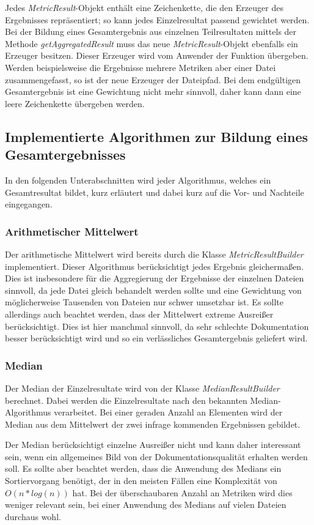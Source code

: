 Jedes \textit{MetricResult}-Objekt enthält eine Zeichenkette, die den Erzeuger des Ergebnisses repräsentiert; so kann jedes Einzelresultat passend gewichtet werden. Bei der Bildung eines Gesamtergebnis aus einzelnen Teilresultaten mittels der Methode \textit{getAggregatedResult} muss das neue \textit{MetricResult}-Objekt ebenfalls ein Erzeuger besitzen. Dieser Erzeuger wird vom Anwender der Funktion übergeben. Werden beispielsweise die Ergebnisse mehrere Metriken aber einer Datei zusammengefasst, so ist der neue Erzeuger der Dateipfad. Bei dem endgültigen Gesamtergebnis ist eine Gewichtung nicht mehr sinnvoll, daher kann dann eine leere Zeichenkette übergeben werden.

\subsection{Implementierte Algorithmen zur Bildung eines Gesamtergebnisses}
In den folgenden Unterabschnitten wird jeder Algorithmus, welches ein Gesamtresultat bildet, kurz erläutert und dabei kurz auf die Vor- und Nachteile eingegangen. 

\subsubsection{Arithmetischer Mittelwert}
Der arithmetische Mittelwert wird bereits durch die Klasse \textit{MetricResultBuilder} implementiert. Dieser Algorithmus berücksichtigt jedes Ergebnis gleichermaßen. Dies ist insbesondere für die Aggregierung der Ergebnisse der einzelnen Dateien sinnvoll, da jede Datei gleich behandelt werden sollte und eine Gewichtung von möglicherweise Tausenden von Dateien nur schwer umsetzbar ist. Es sollte allerdings auch beachtet werden, dass der Mittelwert extreme Ausreißer berücksichtigt. Dies ist hier manchmal sinnvoll, da sehr schlechte Dokumentation besser berücksichtigt wird und so ein verlässliches Gesamtergebnis geliefert wird.


\subsubsection{Median}
Der Median der Einzelresultate wird von der Klasse \textit{MedianResultBuilder} berechnet. Dabei werden die Einzelresultate nach den bekannten Median-Algorithmus verarbeitet. Bei einer geraden Anzahl an Elementen wird der Median aus dem Mittelwert der zwei infrage kommenden Ergebnissen gebildet. 

Der Median berücksichtigt einzelne Ausreißer nicht und kann daher interessant sein, wenn ein allgemeines Bild von der Dokumentationsqualität erhalten werden soll. Es sollte aber beachtet werden, dass die Anwendung des Medians ein Sortiervorgang benötigt, der in den meisten Fällen eine Komplexität von $O(n*log(n))$ hat. Bei der überschaubaren Anzahl an Metriken wird dies weniger relevant sein, bei einer Anwendung des Medians auf vielen Dateien durchaus wohl.


